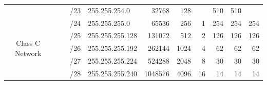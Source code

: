 \documentclass[11pt,a4paper]{article}
\begin{document}
\begin{table}[p!]
\begin{tabular}{ccccl|r|r|r|r|r|r|}
\multicolumn{1}{c|}{}                                  & \multicolumn{1}{c|}{}                                  & \multicolumn{1}{c|}{}                                  & \multicolumn{1}{c|}{/23} & 255.255.254.0                & 32768                        & 128                          &                              & 510                          & 510                          &                              \\ \cline{1-1} \cline{4-11} 
\multicolumn{1}{|c|}{\multirow{7}{*}{\begin{sideways}Class C Network\end{sideways}}} & \multicolumn{1}{c|}{}                                  & \multicolumn{1}{c|}{}                                  & \multicolumn{1}{c|}{/24} & 255.255.255.0                & 65536                        & 256                          & 1                            & 254                          & 254                          & 254                          \\ \cline{4-11} 
\multicolumn{1}{|c|}{}                                 & \multicolumn{1}{c|}{}                                  & \multicolumn{1}{c|}{}                                  & \multicolumn{1}{c|}{/25} & 255.255.255.128              & 131072                       & 512                          & 2                            & 126                          & 126                          & 126                          \\ \cline{4-11} 
\multicolumn{1}{|c|}{}                                 & \multicolumn{1}{c|}{}                                  & \multicolumn{1}{c|}{}                                  & \multicolumn{1}{c|}{/26} & 255.255.255.192              & 262144                       & 1024                         & 4                            & 62                           & 62                           & 62                           \\ \cline{4-11} 
\multicolumn{1}{|c|}{}                                 & \multicolumn{1}{c|}{}                                  & \multicolumn{1}{c|}{}                                  & \multicolumn{1}{c|}{/27} & 255.255.255.224              & 524288                       & 2048                         & 8                            & 30                           & 30                           & 30                           \\ \cline{4-11} 
\multicolumn{1}{|c|}{}                                 & \multicolumn{1}{c|}{}                                  & \multicolumn{1}{c|}{}                                  & \multicolumn{1}{c|}{/28} & 255.255.255.240              & 1048576                      & 4096                         & 16                           & 14                           & 14                           & 14                           \\ \cline{4-11} 

\end{tabular}
\end{table}
\end{document}
